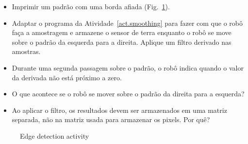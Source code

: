 
\begin{framed}
\begin{itemize}
\item Imprimir um padrão com uma borda afiada (Fig.~\ref{fig.edge-activity}).
\item Adaptar o programa da Atividade~\ref{act.smoothing} para fazer com que o robô faça a amostragem e armazene o sensor de terra enquanto o robô se move sobre o padrão da esquerda para a direita. Aplique um filtro derivado nas amostras.
\item Durante uma segunda passagem sobre o padrão, o robô indica quando o valor da derivada não está próximo a zero.
\item O que acontece se o robô se mover sobre o padrão da direita para a esquerda?
\item Ao aplicar o filtro, os resultados devem ser armazenados em uma matriz separada, não na matriz usada para armazenar os pixels. Por quê?
\end{itemize}
\end{framed}

\begin{figure}
\caption{Edge detection activity}\label{fig.edge-activity}
\end{figure}

